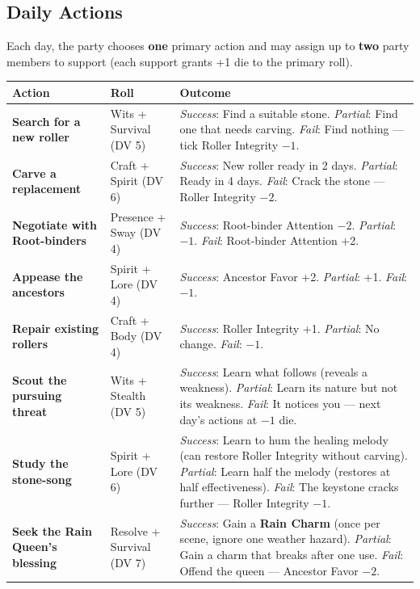 \begin{tcolorbox}[colback=black!3,colframe=green!60!black,title={The Nine Rollers: A City on the Edge},breakable]
  \vspace{2mm}
  \subsection*{Daily Actions}
  
  Each day, the party chooses \textbf{one} primary action and may assign up to \textbf{two} party members to support (each support grants +1 die to the primary roll).
  
  \begin{longtable}{|p{}|p{}|p{}|}
  \hline
  \textbf{Action} & \textbf{Roll} & \textbf{Outcome} \\
  \hline
  \textbf{Search for a new roller} & Wits + Survival (DV 5) & \textit{Success}: Find a suitable stone. \textit{Partial}: Find one that needs carving. \textit{Fail}: Find nothing --- tick Roller Integrity $-1$. \\
  \hline
  \textbf{Carve a replacement} & Craft + Spirit (DV 6) & \textit{Success}: New roller ready in 2 days. \textit{Partial}: Ready in 4 days. \textit{Fail}: Crack the stone --- Roller Integrity $-2$. \\
  \hline
  \textbf{Negotiate with Root-binders} & Presence + Sway (DV 4) & \textit{Success}: Root-binder Attention $-2$. \textit{Partial}: $-1$. \textit{Fail}: Root-binder Attention +2. \\
  \hline
  \textbf{Appease the ancestors} & Spirit + Lore (DV 4) & \textit{Success}: Ancestor Favor +2. \textit{Partial}: +1. \textit{Fail}: $-1$. \\
  \hline
  \textbf{Repair existing rollers} & Craft + Body (DV 4) & \textit{Success}: Roller Integrity +1. \textit{Partial}: No change. \textit{Fail}: $-1$. \\
  \hline
  \textbf{Scout the pursuing threat} & Wits + Stealth (DV 5) & \textit{Success}: Learn what follows (reveals a weakness). \textit{Partial}: Learn its nature but not its weakness. \textit{Fail}: It notices you --- next day's actions at $-1$ die. \\
  \hline
  \textbf{Study the stone-song} & Spirit + Lore (DV 6) & \textit{Success}: Learn to hum the healing melody (can restore Roller Integrity without carving). \textit{Partial}: Learn half the melody (restores at half effectiveness). \textit{Fail}: The keystone cracks further --- Roller Integrity $-1$. \\
  \hline
  \textbf{Seek the Rain Queen's blessing} & Resolve + Survival (DV 7) & \textit{Success}: Gain a \textbf{Rain Charm} (once per scene, ignore one weather hazard). \textit{Partial}: Gain a charm that breaks after one use. \textit{Fail}: Offend the queen --- Ancestor Favor $-2$. \\
  \hline
  \end{longtable}
  

\end{tcolorbox}
